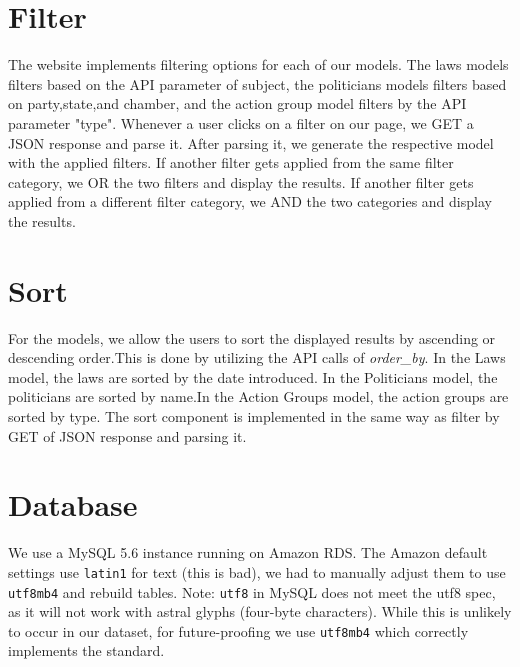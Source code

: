 \documentclass[12pt]{article}
\newcommand{\code}[1]{\texttt{#1}}
\begin{document}
\section{Filter}

The website implements filtering options for each of our models. The laws models filters based on the API parameter of subject, the politicians models filters based on party,state,and chamber, and the action group model filters by the API parameter "type". Whenever a user clicks on a filter on our page, we GET a JSON response and parse it. After parsing it, we generate the respective model with the applied filters. If another filter gets applied from the same filter category, we OR the two filters and display the results. If another filter gets applied from a different filter category, we AND the two categories and display the results. 

\section{Sort}

For the models, we allow the users to sort the displayed results by ascending or descending order.This is done by utilizing the API calls of \textit{order\_by}. In the Laws model, the laws are sorted by the date introduced. In the Politicians model, the politicians are sorted by name.In the Action Groups model, the action groups are sorted by type. The sort component is implemented in the same way as filter by GET of JSON response and parsing it.

\section{Database}

We use a MySQL 5.6 instance running on Amazon RDS. The Amazon default settings use \code{latin1} for text (this is bad), we had to manually adjust them to use \code{utf8mb4} and rebuild tables. Note: \code{utf8} in MySQL does not meet the utf8 spec, as it will not work with astral glyphs (four-byte characters). While this is unlikely to occur in our dataset, for future-proofing we use \code{utf8mb4} which correctly implements the standard. 
\end{document}

